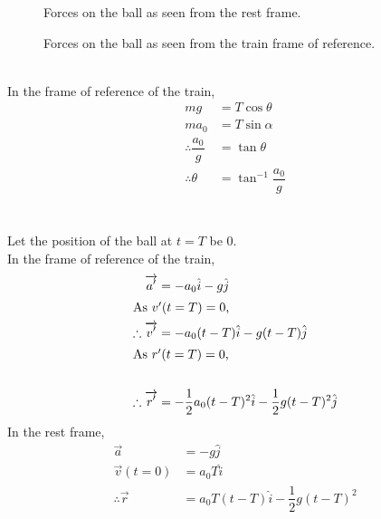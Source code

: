 \documentclass[fleqn, a4paper, 12pt]{amsart}
\theoremstyle{definition}
\theoremstyle{theorem}
\begin{document}
\begin{figure}[H]
	\caption{Forces on the ball as seen from the rest frame.}
\end{figure}

\begin{figure}[H]
	\caption{Forces on the ball as seen from the train frame of reference.}
\end{figure}
~\\
In the frame of reference of the train,
\begin{align*}
	m g &= T \cos \theta\\
	m a_0 &= T \sin \alpha\\
	\therefore \dfrac{a_0}{g} &= \tan \theta\\
	\therefore \theta &= \tan^{-1} \dfrac{a_0}{g}
\end{align*}\\
~\\
Let the position of the ball at $t = T$ be 0.\\
In the frame of reference of the train,
\begin{align*}
	\overrightarrow{a'} &= - a_0 \hat{i} - g \hat{j}\\
	\intertext{As $v'(t = T) = 0$,}
	\therefore \overrightarrow{v'} &= - a_0 (t - T) \hat{i} - g (t - T) \hat{j}\\
	\intertext{As $r'(t = T) = 0$,}\\
	\therefore \overrightarrow{r'} &= - \dfrac{1}{2} a_0 (t - T)^2 \hat{i} - \dfrac{1}{2} g (t - T)^2 \hat{j}
\end{align*}
In the rest frame,
\begin{align*}
	\overrightarrow{a} &= - g \hat{j}\\
	\overrightarrow{v}(t = 0) &= a_0 T \hat{i}\\
	\therefore \overrightarrow{r} &= a_0 T (t - T) \hat{i} - \dfrac{1}{2} g (t - T)^2
\end{align*}
\end{document}
